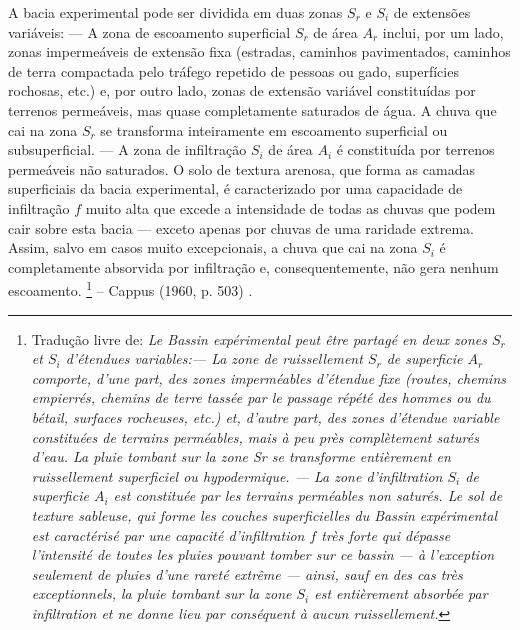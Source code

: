 \documentclass[./main.tex]{subfiles}
\begin{document}
\begin{adjustwidth}{100pt}{0pt}
\medskip
\small
A bacia experimental pode ser dividida em duas zonas \(S_r\) e \(S_i\) de extensões variáveis: --- A zona de escoamento superficial \(S_r\) de área \(A_r\) inclui, por um lado, zonas impermeáveis de extensão fixa (estradas, caminhos pavimentados, caminhos de terra compactada pelo tráfego repetido de pessoas ou gado, superfícies rochosas, etc.) e, por outro lado, zonas de extensão variável constituídas por terrenos permeáveis, mas quase completamente saturados de água. A chuva que cai na zona \(S_r\) se transforma inteiramente em escoamento superficial ou subsuperficial. --- A zona de infiltração \(S_i\) de área \(A_i\) é constituída por terrenos permeáveis não saturados. O solo de textura arenosa, que forma as camadas superficiais da bacia experimental, é caracterizado por uma capacidade de infiltração \(f\) muito alta que excede a intensidade de todas as chuvas que podem cair sobre esta bacia — exceto apenas por chuvas de uma raridade extrema. Assim, salvo em casos muito excepcionais, a chuva que cai na zona \(S_i\) é completamente absorvida por infiltração e, consequentemente, não gera nenhum escoamento.
\footnote{Tradução livre de: 
\textit{
Le Bassin expérimental peut être partagé en deux zones $S_r$ et $S_i$ d'étendues variables:\;--- La zone de ruissellement $S_r$ de superficie $A_r$ comporte, d'une part, des zones imperméables d'étendue fixe (routes, chemins empierrés, chemins de terre tassée par le passage répété des hommes ou du bétail, surfaces rocheuses, etc.) et, d'autre part, des zones d'étendue variable constituées de terrains perméables, mais à peu près complètement saturés d'eau. La pluie tombant sur la zone Sr se transforme entièrement en ruissellement superficiel ou hypodermique. --- La zone d'infiltration $S_i$ de superficie $A_i$ est constituée par les terrains perméables non saturés. Le sol de texture sableuse, qui forme les couches superficielles du Bassin expérimental est caractérisé par une capacité d'infiltration $f$ très forte qui dépasse l'intensité de toutes les pluies pouvant tomber sur ce bassin — à l'exception seulement de pluies d'une rareté extrême — ainsi, sauf en des cas très exceptionnels, la pluie tombant sur la zone $S_i$ est entièrement absorbée par infiltration et ne donne lieu par conséquent à aucun ruissellement.
}} -- Cappus (1960, p. 503) \cite{Cappus1960}.
\medskip
\end{adjustwidth}
\end{document}
